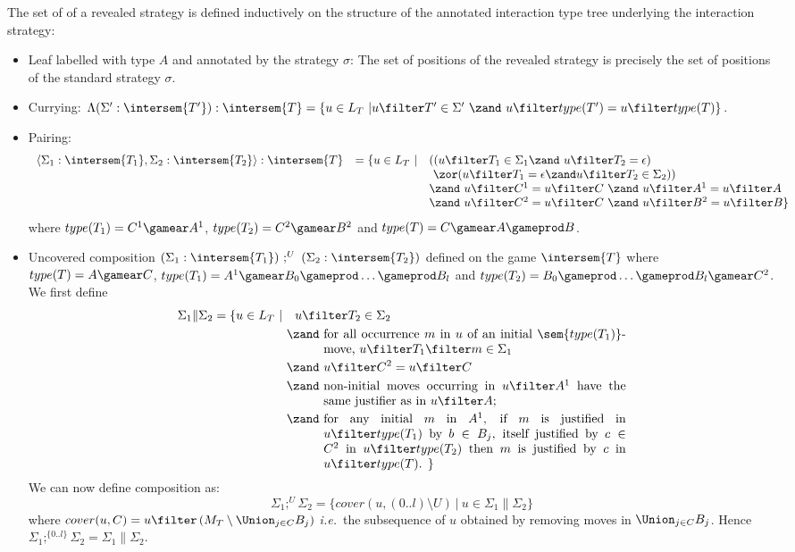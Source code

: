 \begin{definition}
\label{dfn:revealedstrat}
The set of  of a revealed strategy is defined inductively on the
structure of the annotated interaction type tree underlying the
interaction strategy:
\begin{itemize}[-]
\item Leaf labelled with type $A$ and annotated by the strategy $\sigma$: The set of positions of the revealed strategy is precisely the set of positions of the standard strategy $\sigma$.

\item Currying: $\Lambda(\Sigma' : \intersem{T'}) : \intersem{T} = \{ u \in L_T \ |  u \filter T' \in \Sigma' \ \zand\ u\filter type(T') = u\filter type(T) \}$.

\item Pairing: $$\begin{array}{lcll}
\langle \Sigma_1 : \intersem{T_1}, \Sigma_2 : \intersem{T_2} \rangle : \intersem{T} &= \{ u \in L_T \ | &
   ( (u \filter T_1 \in \Sigma_1 \zand\ u \filter T_2 = \epsilon) \\
&&  \   \zor ( u \filter T_1 = \epsilon \zand u \filter T_2 \in \Sigma_2)) \\
&& \zand\ u\filter C^1 = u\filter C\ \zand\ u\filter A^1= u\filter A  \\
&& \zand\ u\filter C^2 = u\filter C\ \zand\ u\filter B^2 =
u\filter B  \}
\end{array}$$
where $type(T_1) = C^1\gamear A^1$, $type(T_2) = C^2\gamear B^2$
and $type(T) = C\gamear A \gameprod B$.


\item Uncovered composition $(\Sigma_1 : \intersem{T_1})\ ;^U\ (\Sigma_2
:\intersem{T_2})$ defined on the game $\intersem{T}$ where
$type(T) = A \gamear C$, $type(T_1) = A^1 \gamear B_0 \gameprod
\ldots \gameprod B_l$ and $type(T_2) = B_0 \gameprod \ldots
\gameprod B_l \gamear C^2$. We first define
\begin{align*}
\Sigma_1 \| \Sigma_2 = \{ u \in L_T  \ | \
& \ \ u \filter T_2 \in \Sigma_2 \\
& \zand\ \parbox[t]{8.5cm}{for all occurrence $m$ in $u$ of an initial
                $\sem{type(T_1)}$-move, $u \filter T_1 \filter m \in \Sigma_1$} \\
& \zand\ u\filter C^2 = u\filter C \\
& \zand\ \parbox[t]{8.5cm}{non-initial moves occurring in $u\filter A^1$
have the same justifier as in $u\filter A$;} \\
& \zand\ \parbox[t]{8.5cm}{for any initial $m$ in $A^1$, if $m$ is justified in $u \filter type(T_1)$ by $b\in B_j$,
itself justified by $c \in C^2$ in $u \filter type(T_2)$ then $m$ is justified by $c$ in $u \filter type(T)$. \} }
\end{align*}
We can now define composition as:
$$ \Sigma_1 ;^U \Sigma_2 = \{ cover(u,(0..l)\setminus U) \ | \ u \in \Sigma_1 \| \Sigma_2 \}$$
where $cover(u,C) = u \filter \left( M_T \setminus \Union_{j\in
C} B_j \right)$ {\it i.e.}~the subsequence of $u$ obtained by
removing moves in $\Union_{j\in C} B_j$. Hence
$\Sigma_1;^{\{0..l\}} \Sigma_2 = \Sigma_1 \| \Sigma_2$.


\end{itemize}
\end{definition}
